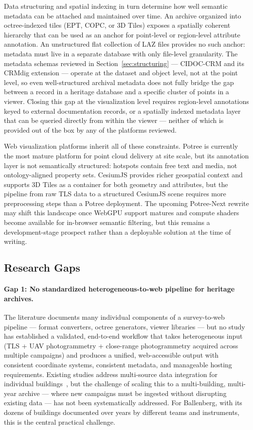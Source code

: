 \documentclass[]{report}
\begin{document}
Data structuring and spatial indexing in turn determine how well semantic metadata can be
attached and maintained over time. An archive organized into octree-indexed tiles (EPT, COPC,
or 3D Tiles) exposes a spatially coherent hierarchy that can be used as an anchor for
point-level or region-level attribute annotation. An unstructured flat collection of LAZ files
provides no such anchor: metadata must live in a separate database with only file-level
granularity. The metadata schemas reviewed in Section~\ref{sec:structuring} --- CIDOC-CRM
and its CRMdig extension --- operate at the dataset and object level, not at the point level,
so even well-structured archival metadata does not fully bridge the gap between a record in a
heritage database and a specific cluster of points in a viewer. Closing this gap at the visualization level requires region-level annotations keyed to
external documentation records, or a spatially indexed metadata layer that can be queried
directly from within the viewer --- neither of which is provided out of the box by any of
the platforms reviewed.


Web visualization platforms inherit all of these constraints. Potree is currently the most
mature platform for point cloud delivery at site scale, but its annotation layer is not
semantically structured: hotspots contain free text and media, not ontology-aligned property
sets. CesiumJS provides richer geospatial context and supports 3D Tiles as a container for
both geometry and attributes, but the pipeline from raw TLS data to a structured CesiumJS
scene requires more preprocessing steps than a Potree deployment. The upcoming
Potree-Next rewrite may shift this landscape once WebGPU support matures and compute shaders
become available for in-browser semantic filtering, but this remains a development-stage
prospect rather than a deployable solution at the time of writing.

\subsection{Research Gaps}

\paragraph{Gap 1: No standardized heterogeneous-to-web pipeline for heritage archives.}
The literature documents many individual components of a survey-to-web pipeline --- format
converters, octree generators, viewer libraries --- but no study has established a validated,
end-to-end workflow that takes heterogeneous input (TLS + UAV photogrammetry + close-range
photogrammetry acquired across multiple campaigns) and produces a unified, web-accessible
output with consistent coordinate systems, consistent metadata, and manageable hosting
requirements. Existing studies address multi-source data integration for individual buildings~\cite{pepe2024integration, hassan2021scanner},
but the challenge of scaling this to a multi-building, multi-year archive --- where new
campaigns must be ingested without disrupting existing data --- has not been systematically
addressed. For Ballenberg, with its dozens of buildings documented over years by different
teams and instruments, this is the central practical challenge.
\end{document}
